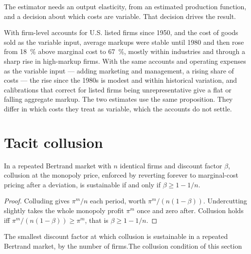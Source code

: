 The estimator needs an output elasticity, from an estimated production function, and
a decision about which costs are variable. That decision drives the result.

\begin{record}
With firm-level accounts for U.S. listed firms since 1950, and the cost of goods sold
as the variable input, average markups were stable until 1980 and then rose from 18~\%
above marginal cost to 67~\%, mostly within industries and through a sharp rise in
high-markup firms. %
With the same accounts and operating expenses as the variable input --- adding
marketing and management, a rising share of costs --- the rise since the 1980s is
modest and within historical variation, and calibrations that correct for listed
firms being unrepresentative give a flat or falling aggregate markup. %
The two estimates use the same proposition. They differ in which costs they treat as
variable, which the accounts do not settle.
\end{record}

\section{Tacit collusion}\label{sec:b3:oligopoly-and-collusion:collusion}

\begin{proposition}\label{prop:b3:oligopoly-and-collusion:collusion}
In a repeated Bertrand market with $n$ identical firms and discount factor $\beta$, collusion at the
monopoly price, enforced by reverting forever to marginal-cost pricing after a
deviation, is sustainable if and only if $\beta \ge 1 - 1/n$.
\end{proposition}

\begin{proof}
Colluding gives $\pi^m/n$ each period, worth $\pi^m/(n(1 - \beta))$. Undercutting slightly takes the whole
monopoly profit $\pi^m$ once and zero after. Collusion holds iff $\pi^m/(n(1 - \beta)) \ge \pi^m$, that is $\beta \ge 1 - 1/n$.
\end{proof}

\begin{omchart}{The smallest discount factor at which collusion is sustainable in a
repeated Bertrand market, by the number of firms.}{The collusion condition of this
section}
\end{omchart}

